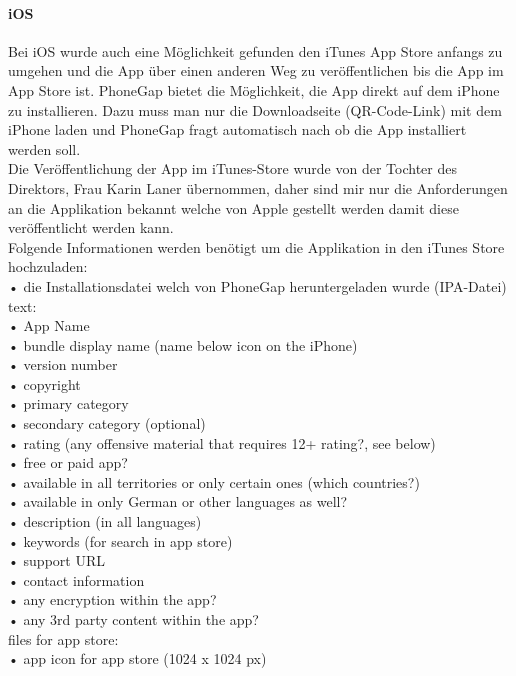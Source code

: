 \paragraph{iOS\\}

Bei iOS wurde auch eine Möglichkeit gefunden den iTunes App Store anfangs zu umgehen und die App über einen anderen Weg zu veröffentlichen bis die App im App Store ist. PhoneGap bietet die Möglichkeit, die App direkt auf dem iPhone zu installieren. Dazu muss man nur die Downloadseite (QR-Code-Link) mit dem iPhone laden und PhoneGap fragt automatisch nach ob die App installiert werden soll.\\
Die Veröffentlichung der App im iTunes-Store wurde von der Tochter des Direktors, Frau Karin Laner übernommen, daher sind mir nur die Anforderungen an die Applikation bekannt welche von Apple gestellt werden damit diese veröffentlicht werden kann.\\
Folgende Informationen werden benötigt um die Applikation in den iTunes Store hochzuladen:\\
• die Installationsdatei welch von PhoneGap heruntergeladen wurde (IPA-Datei)\\
text:\\
• App Name\\
• bundle display name (name below icon on the iPhone)\\
• version number\\
• copyright\\
• primary category\\
• secondary category (optional)\\
• rating (any offensive material that requires 12+ rating?, see below)\\
• free or paid app?\\
• available in all territories or only certain ones (which countries?)\\
• available in only German or other languages as well?\\
• description (in all languages)\\
• keywords (for search in app store)\\
• support URL\\
• contact information\\
• any encryption within the app?\\
• any 3rd party content within the app?\\
files for app store:\\
• app icon for app store (1024 x 1024 px)\\
